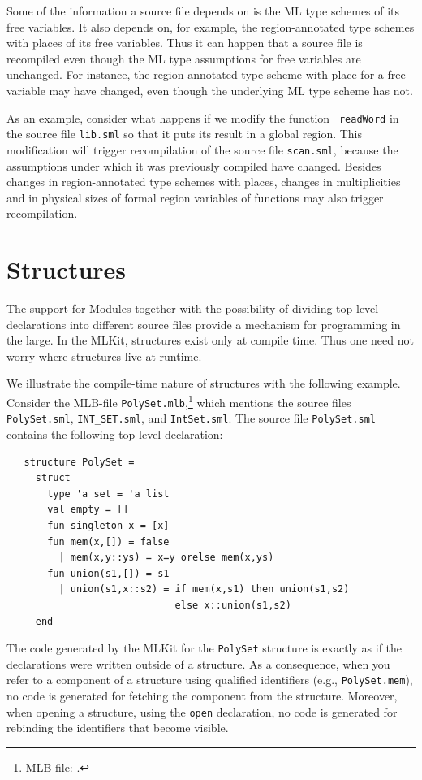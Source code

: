 \documentclass[12pt]{book}
\begin{document}
Some of the information a source file depends on is the ML type
schemes of its free variables. It also depends on, for example, the
region-annotated type schemes with places of its free variables.  Thus
it can happen that a source file is recompiled even though the ML type
assumptions for free variables are unchanged. For instance, the
region-annotated type scheme with place for a free variable may have
changed, even though the underlying ML type scheme has not.

As an example, consider what happens if we modify the function {\tt
  readWord} in the source file {\tt lib.sml} so that it puts its
result in a global region. This modification will trigger
recompilation of the source file {\tt scan.sml}, because the
assumptions under which it was previously compiled have changed.
Besides changes in region-annotated type schemes with places, changes
in multiplicities and in physical sizes of formal region variables of
functions may also trigger recompilation.


\section{Structures}
The support for Modules together with the possibility of dividing
top-level declarations into different source files provide a mechanism
for programming in the large. In the MLKit, structures exist only at
compile time.  Thus one need not worry where
%
structures live at runtime.

We illustrate the compile-time nature of structures with the following
example. Consider the MLB-file {\tt PolySet.mlb},\footnote{MLB-file:
  .} which mentions the source files {\tt
  PolySet.sml}, {\tt INT\_SET.sml}, and {\tt IntSet.sml}. The source
file {\tt PolySet.sml} contains the following top-level declaration:
\begin{verbatim}
   structure PolySet =
     struct
       type 'a set = 'a list
       val empty = []
       fun singleton x = [x]
       fun mem(x,[]) = false
         | mem(x,y::ys) = x=y orelse mem(x,ys)
       fun union(s1,[]) = s1
         | union(s1,x::s2) = if mem(x,s1) then union(s1,s2)
                             else x::union(s1,s2)
     end
\end{verbatim}
The code generated by the MLKit for the {\tt PolySet} structure is
exactly as if the declarations were written outside of a structure.
As a consequence, when you refer to a component of a structure using
qualified identifiers (e.g., {\tt PolySet.mem}), no code is generated
for fetching the component from the structure. Moreover, when opening
a structure, using the
%
{\tt open} declaration, no code is generated for rebinding the
identifiers that become visible.
\end{document}
